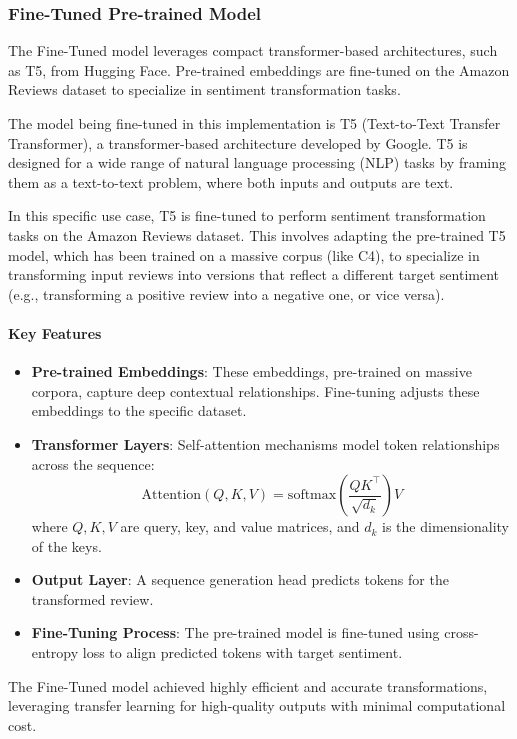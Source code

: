 \documentclass{article}
\begin{document}
\subsubsection{Fine-Tuned Pre-trained Model}
The Fine-Tuned model leverages compact transformer-based architectures, such as T5, from Hugging Face. Pre-trained embeddings are fine-tuned on the Amazon Reviews dataset to specialize in sentiment transformation tasks.

The model being fine-tuned in this implementation is T5 (Text-to-Text Transfer Transformer), a transformer-based architecture developed by Google. T5 is designed for a wide range of natural language processing (NLP) tasks by framing them as a text-to-text problem, where both inputs and outputs are text.

In this specific use case, T5 is fine-tuned to perform sentiment transformation tasks on the Amazon Reviews dataset. This involves adapting the pre-trained T5 model, which has been trained on a massive corpus (like C4), to specialize in transforming input reviews into versions that reflect a different target sentiment (e.g., transforming a positive review into a negative one, or vice versa).

\paragraph{Key Features}
\begin{itemize}
    \item \textbf{Pre-trained Embeddings}: These embeddings, pre-trained on massive corpora, capture deep contextual relationships. Fine-tuning adjusts these embeddings to the specific dataset.
    \item \textbf{Transformer Layers}: Self-attention mechanisms model token relationships across the sequence:
    \[
    \text{Attention}(Q, K, V) = \text{softmax}\left( \frac{QK^\top}{\sqrt{d_k}} \right)V
    \]
    where \(Q, K, V\) are query, key, and value matrices, and \(d_k\) is the dimensionality of the keys.
    \item \textbf{Output Layer}: A sequence generation head predicts tokens for the transformed review.
    \item \textbf{Fine-Tuning Process}: The pre-trained model is fine-tuned using cross-entropy loss to align predicted tokens with target sentiment.
\end{itemize}
The Fine-Tuned model achieved highly efficient and accurate transformations, leveraging transfer learning for high-quality outputs with minimal computational cost.
\end{document}
